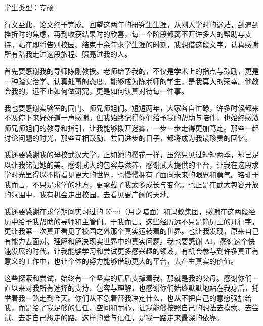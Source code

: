 \documentclass[type = master, class = professional]{whu-thesis}
\newif\ifthesisblindreview
\newcommand{\thesistitlepage}{%
  \clearpage
  \thispagestyle{empty}
  \vspace*{\fill}
  \begin{center}
    {\heiti\zihao{0} 学生类型：专硕}
  \end{center}
  \vspace*{\fill}
  \clearpage
}
\begin{document}
\raggedbottom

\thesistitlepage

\setcounter{tocdepth}{2}
\tableofcontents

\mainmatter








\printbibliography

\ifthesisblindreview\else
\begin{acknowledgements}
行文至此，论文终于完成。回望这两年的研究生生涯，从刚入学时的迷茫，到遇到挫折时的焦虑，再到收获结果时的欣喜，每一个阶段都离不开许多人的帮助与支持。站在即将告别校园、结束十余年求学生涯的时刻，我想借这段文字，认真感谢所有陪我走过这段旅程、照亮过我的人。

首先要感谢我的导师陈刚教授。老师给予我的，不仅是学术上的指点与鼓励，更是一种踏实治学、认真处事的态度。能够成为陈老师的学生，是我莫大的荣幸。他教会我的，远不止如何做研究，更是如何认真对待每一件事。

我也要感谢实验室的同门、师兄师姐们。短短两年，大家各自忙碌，许多时候都来不及停下来好好道一声感谢。但我始终记得你们给予我的帮助与陪伴，也始终感激师兄师姐们的教导和指引，让我能够拨开迷雾，一步一步走得更加笃定。那些一起讨论问题的时光，那些互相鼓励、共同进步的日子，都将成为我最珍贵的回忆。

我还要感谢我的母校武汉大学。正如她的樱花一样，虽然只见过短短两季，却已足以让我铭记她的美。感谢武大的包容与滋养，感谢武大提供的平台，让我在这段求学时光里得以不断看见更大的世界，也慢慢拥有了面向未来的眼界和勇气。珞珈于我而言，不只是求学的地方，更承载了我太多成长与变化。也正是在武大包容开放的氛围中，我有机会走出校园，去看见更广阔的天地。

我还要感谢在求学期间实习过的 Kimi（月之暗面）和蚂蚁集团，感谢在这两段经历中给予我帮助的导师和主管们。于我而言，这些经历远不只是简历上的几行字，更让我第一次真正看见了校园之外那个真实运转着的世界。也让我发现，原来自己有能力去面对、理解和解决现实世界中的真实问题。我也要感谢 AI，感谢这个快速发展的时代，让我能够学习和尝试更多感兴趣的领域，有机会参与到许多真正有意义的工作中，也让个体的努力能够借助更大的平台，去产生真实的价值。

这些探索和尝试，始终有一个坚实的后盾支撑着我，那就是我的父母。感谢你们一直以来对我所有选择的支持、包容与理解，也感谢你们始终默默地站在我身后，托举着我一路走到今天。你们从不急着替我决定什么，也从不把自己的意愿强加给我，而是给了我足够的信任、空间和耐心，让我能够按照自己的想法去摸索、去尝试、去走自己想走的路。这样的爱与信任，是我一路走来最深的依靠。


\end{acknowledgements}
\end{document}
